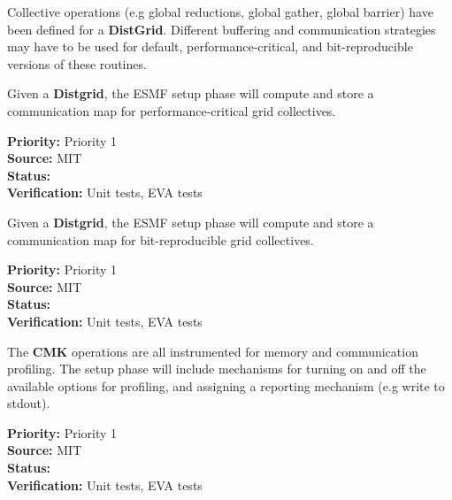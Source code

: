 
Collective operations (e.g global reductions, global gather, global
barrier) have been defined for a \textbf{DistGrid}. Different
buffering and communication strategies may have to be used for
default, performance-critical, and bit-reproducible versions of these
routines.


Given a \textbf{Distgrid}, the ESMF setup
phase will compute and store a communication map for
performance-critical grid collectives.

\begin{reqlist}
{\bf Priority:} Priority 1 \\
{\bf Source:}  MIT \\
{\bf Status:}  \\
{\bf Verification:} Unit tests, EVA tests \\
\end{reqlist}


Given a \textbf{Distgrid}, the ESMF setup
phase will compute and store a communication map for
bit-reproducible grid collectives.

\begin{reqlist}
{\bf Priority:} Priority 1 \\
{\bf Source:}  MIT \\
{\bf Status:}  \\
{\bf Verification:} Unit tests, EVA tests \\
\end{reqlist}


The \textbf{CMK} operations are all instrumented for memory and
communication profiling. The setup phase will include mechanisms for
turning on and off the available options for profiling, and assigning
a reporting mechanism (e.g write to stdout).

\begin{reqlist}
{\bf Priority:} Priority 1 \\
{\bf Source:}  MIT \\
{\bf Status:}  \\
{\bf Verification:} Unit tests, EVA tests \\
\end{reqlist}



